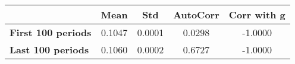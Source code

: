 \begin{tiny}\begin{tabular}{|l|c|c|c|c|}
\hline
&\textbf{Mean}&\textbf{Std}&\textbf{AutoCorr}&\textbf{Corr with g}\\\hline
\textbf{First 100 periods}&0.1047&0.0001&0.0298&-1.0000\\\hline
\textbf{Last 100 periods}&0.1060&0.0002&0.6727&-1.0000\\\hline
\end{tabular}
\end{tiny}